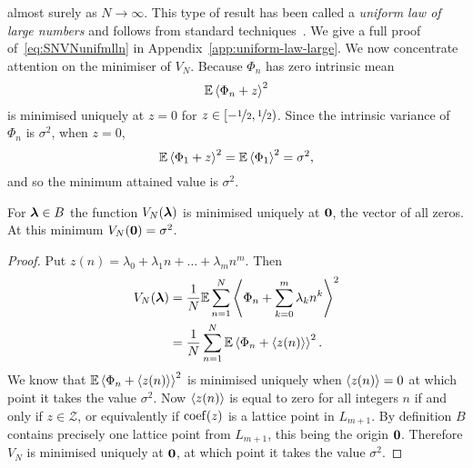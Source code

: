 \documentclass[journal]{IEEEtran}
\begin{document}
almost surely as $N\rightarrow\infty$.  This type of result has been called a \emph{uniform law of large numbers} and follows from standard techniques~\cite{Pollard_conv_stat_proc_1984}.  We give a full proof of~\eqref{eq:SNVNunifmlln} in Appendix~\ref{app:uniform-law-large}.  We now concentrate attention on the minimiser of $V_N$. Because $\Phi_n$ has zero intrinsic mean 
\begin{equation}\label{eq:Efracpartmined}
\expect \fracpart{ \Phi_n + z }^{2}
\end{equation}
is minimised uniquely at $z = 0$ for $z \in [-\nicefrac{1}{2}, \nicefrac{1}{2})$.  Since the intrinsic variance of $\Phi_n$ is $\sigma^2$, when $z = 0$,
\begin{equation}\label{eq:Efracpartphi}
\expect\fracpart{\Phi_1+z}^{2} = \expect\fracpart{\Phi_1}^{2} = \sigma^2,
\end{equation}
and so the minimum attained value is $\sigma^2$.

\begin{lemma}\label{lem:ES_Nminimisedzero}
For $\boldsymbol{\lambda} \in B$ the function $V_N(\boldsymbol{\lambda})$ is minimised uniquely at $\boldsymbol{0}$, the vector of all zeros.  At this minimum $V_N(\boldsymbol{0}) = \sigma^2$.
\end{lemma}
\begin{proof}
Put $z(n) = \lambda_0 + \lambda_1 n + \dots + \lambda_m n^m$.  Then
\begin{align*}
V_N(\boldsymbol{\lambda}) &= \frac{1}{N}{\mathbb E}\sum_{n=1}^{N}\left\langle  \Phi_n + \sum_{k=0}^m{\lambda_k n^k}  \right\rangle^2 \\
&= \frac{1}{N}\sum_{n=1}^{N}{\mathbb E}\left\langle  \Phi_n + \left\langle z(n) \right\rangle  \right\rangle^2.
\end{align*}
We know that ${\mathbb E}\left\langle  \Phi_n + \left\langle z(n) \right\rangle  \right\rangle^2$ is minimised uniquely when $\left\langle z(n) \right\rangle = 0$ at which point it takes the value $\sigma^2$. Now $\left\langle z(n) \right\rangle$ is equal to zero for all integers $n$ if and only if $z \in \mathcal{Z}$, or equivalently if $\operatorname{coef}(z)$ is a lattice point in $L_{m+1}$. By definition $B$ contains precisely one lattice point from $L_{m+1}$, this being the origin $\boldsymbol{0}$. Therefore $V_N$ is minimised uniquely at $\boldsymbol{0}$, at which point it takes the value $\sigma^2$.
\end{proof}
\end{document}
